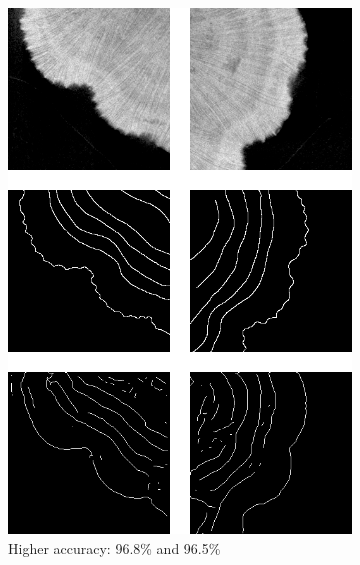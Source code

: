 \begin{figure}[t]
    \centering
    \begin{subfigure}[t]{0.38\textwidth}
        \centering
        \includegraphics[width=1\textwidth, valign=c]{images/good-initial.png}
        \caption{Higher accuracy: 96.8\% and 96.5\%}
    \end{subfigure}
    ~
    \begin{subfigure}[t]{0.58\textwidth}
        \centering

\end{subfigure}
\end{figure}
